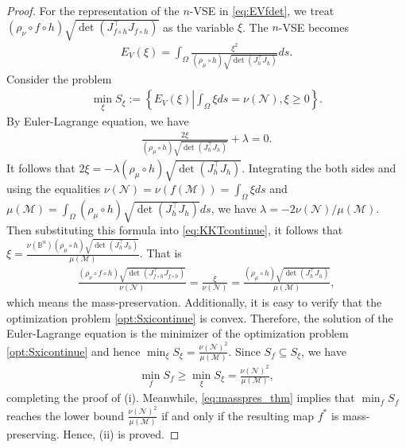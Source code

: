 \documentclass{article}
\begin{document}
\begin{proof}
For the representation of the $n$-VSE in \eqref{eq:EVfdet}, we treat $(\rho_{\nu} \circ f \circ h) \sqrt{\det(J_{f\circ h}^\top J_{f\circ h})}$ as the variable $\xi$.
The $n$-VSE becomes
\begin{align}
    E_V(\xi) = \int_\Omega \frac{\xi^2}{(\rho_\mu \circ h) \sqrt{\det(J_{h}^\top J_h)}} ds.
\end{align}
Consider the problem
    \begin{align} \label{opt:Sxicontinue}
        \min_{\xi} S_\xi := \left\{ E_V(\xi) \left| \int_\Omega \xi ds = \nu(\mathcal{N}), \xi \geq 0 \right.\right\}.
    \end{align}
    By Euler-Lagrange equation, we have
    \begin{align} \label{eq:KKTcontinue}
        \frac{2\xi}{(\rho_\mu \circ h) \sqrt{\det(J_{h}^\top J_h)}} + \lambda = 0.
    \end{align}
    It follows that $2\xi = -\lambda (\rho_\mu \circ h) \sqrt{\det(J_{h}^\top J_h)}$. Integrating the both sides and using the equalities $\nu(\mathcal{N}) = \nu(f(\mathcal{M})) = \int_\Omega \xi ds$ and $\mu(\mathcal{M}) = \int_\Omega (\rho_\mu \circ h) \sqrt{\det(J_{h}^\top J_h)} ds$, we have $\lambda = -2\nu(\mathcal{N}) / \mu(\mathcal{M})$. Then substituting this formula into \eqref{eq:KKTcontinue}, it follows that $\xi = \frac{\nu(\mathbb{B}^n) (\rho_\mu \circ h) \sqrt{\det(J_{h}^\top J_h)}}{\mu(\mathcal{M})}$. That is
    \begin{align} \label{eq:masspres_thm}
        \frac{(\rho_\nu \circ f \circ h)\sqrt{\det(J_{f\circ h}^\top J_{f\circ h})}}{\nu(\mathcal{N})}
        = \frac{\xi}{\nu(\mathcal{N})}
        = \frac{(\rho_\mu \circ h) \sqrt{\det(J_{h}^\top J_h)}}{\mu(\mathcal{M})},
    \end{align}
    which means the mass-preservation. Additionally, it is easy to verify that the optimization problem \eqref{opt:Sxicontinue} is convex. Therefore, the solution of the Euler-Lagrange equation is the minimizer of the optimization problem \eqref{opt:Sxicontinue} and hence
    $
        \min_\xi S_\xi = \frac{\nu(\mathcal{N})^2}{\mu(\mathcal{M})}
    $.
    Since $S_f \subseteq S_\xi$, we have
    \begin{align}
        \min_f S_f \geq \min_\xi S_\xi = \frac{\nu(\mathcal{N})^2}{\mu(\mathcal{M})},
    \end{align}
    completing the proof of (i). Meanwhile, \eqref{eq:masspres_thm} implies that $\min_f S_f$ reaches the lower bound $\frac{\nu(\mathcal{N})^2}{\mu(\mathcal{M})}$ if and only if the resulting map $f^*$ is mass-preserving. Hence, (ii) is proved.
\end{proof}
\end{document}
